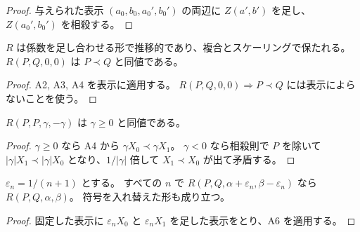 \begin{proof}
  \leanok
  与えられた表示 $(a_0, b_0, a_0', b_0')$ の両辺に $Z(a', b')$ を足し、$Z(a_0', b_0')$ を相殺する。
\end{proof}

\begin{lemma}[推移と加法とスケーリング]
  \label{lem:R-algebra}
  \leanok
  $R$ は係数を足し合わせる形で推移的であり、複合とスケーリングで保たれる。
  $R(P, Q, 0, 0)$ は $P \prec Q$ と同値である。
\end{lemma}

\begin{proof}
  \leanok
  A2, A3, A4 を表示に適用する。
  $R(P,Q,0,0) \Rightarrow P \prec Q$ には表示によらないことを使う。
\end{proof}

\begin{lemma}[基準状態の順序]
  \label{lem:R-base}
  \leanok
  $R(P, P, \gamma, -\gamma)$ は $\gamma \ge 0$ と同値である。
\end{lemma}

\begin{proof}
  \leanok
  $\gamma \ge 0$ なら A4 から $\gamma X_0 \prec \gamma X_1$。
  $\gamma < 0$ なら相殺則で $P$ を除いて $|\gamma| X_1 \prec |\gamma| X_0$ となり、$1/|\gamma|$ 倍して $X_1 \prec X_0$ が出て矛盾する。
\end{proof}

\begin{lemma}[形式的な不等式の安定性]
  \label{lem:R-stability}
  \leanok
  $\varepsilon_n = 1/(n+1)$ とする。
  すべての $n$ で $R(P, Q, \alpha + \varepsilon_n, \beta - \varepsilon_n)$ なら $R(P, Q, \alpha, \beta)$。
  符号を入れ替えた形も成り立つ。
\end{lemma}

\begin{proof}
  \leanok
  固定した表示に $\varepsilon_n X_0$ と $\varepsilon_n X_1$ を足した表示をとり、A6 を適用する。
\end{proof}

